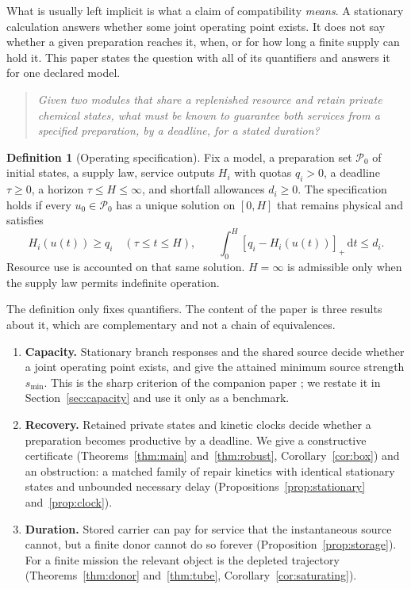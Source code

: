 \documentclass[11pt,a4paper]{article}
\theoremstyle{plain}
\theoremstyle{definition}
\newtheorem{definition}[theorem]{Definition}
\theoremstyle{remark}
\newcommand{\dd}{\,\mathrm d}
\newcommand{\Pp}{\mathcal P}
\newcommand{\pos}[1]{[#1]_+}
\begin{document}
What is usually left implicit is what a claim of compatibility \emph{means}.
A stationary calculation answers whether some joint operating point exists. It
does not say whether a given preparation reaches it, when, or for how long a
finite supply can hold it. This paper states the question with all of its
quantifiers and answers it for one declared model.

\begin{quote}
\emph{Given two modules that share a replenished resource and retain private
chemical states, what must be known to guarantee both services from a specified
preparation, by a deadline, for a stated duration?}
\end{quote}

\begin{definition}[Operating specification]\label{def:spec}
Fix a model, a preparation set $\Pp_0$ of initial states, a supply law,
service outputs $H_i$ with quotas $q_i>0$, a deadline $\tau\ge0$, a horizon
$\tau\le H\le\infty$, and shortfall allowances $d_i\ge0$. The specification
holds if every $u_0\in\Pp_0$ has a unique solution on $[0,H]$ that remains
physical and satisfies
\begin{equation}\label{eq:spec}
H_i(u(t))\ge q_i\quad(\tau\le t\le H),\qquad
\int_0^{H}\pos{q_i-H_i(u(t))}\dd t\le d_i .
\end{equation}
Resource use is accounted on that same solution. $H=\infty$ is admissible
only when the supply law permits indefinite operation.
\end{definition}

The definition only fixes quantifiers. The content of the paper is three
results about it, which are complementary and not a chain of equivalences.

\begin{enumerate}[label=(\roman*)]
\item \textbf{Capacity.} Stationary branch responses and the shared source
decide whether a joint operating point exists, and give the attained minimum
source strength $s_{\min}$. This is the sharp criterion of the companion paper
\citep{companionNADPH}; we restate it in Section~\ref{sec:capacity} and use it
only as a benchmark.
\item \textbf{Recovery.} Retained private states and kinetic clocks decide
whether a preparation becomes productive by a deadline. We give a constructive
certificate (Theorems~\ref{thm:main} and~\ref{thm:robust},
Corollary~\ref{cor:box}) and an obstruction: a matched family of repair
kinetics with identical stationary states and unbounded necessary delay
(Propositions~\ref{prop:stationary} and~\ref{prop:clock}).
\item \textbf{Duration.} Stored carrier can pay for service that the
instantaneous source cannot, but a finite donor cannot do so forever
(Proposition~\ref{prop:storage}). For a finite mission the relevant object is
the depleted trajectory (Theorems~\ref{thm:donor} and~\ref{thm:tube},
Corollary~\ref{cor:saturating}).
\end{enumerate}
\end{document}
